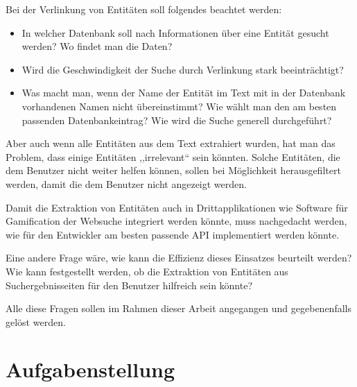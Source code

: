 Bei der Verlinkung von Entitäten soll folgendes beachtet werden:
\begin{itemize}
\item In welcher Datenbank soll nach Informationen über eine Entität gesucht werden? Wo findet man die Daten?
\item Wird die Geschwindigkeit der Suche durch Verlinkung stark beeinträchtigt?
\item Was macht man, wenn der Name der Entität im Text mit in der Datenbank vorhandenen Namen nicht übereinstimmt? Wie wählt man den am besten passenden Datenbankeintrag? Wie wird die Suche generell durchgeführt?
\end{itemize}

Aber auch wenn alle Entitäten aus dem Text extrahiert wurden, hat man das Problem, dass einige Entitäten ,,irrelevant`` sein könnten. Solche Entitäten, die dem Benutzer nicht weiter helfen können, sollen bei Möglichkeit herausgefiltert werden, damit die dem Benutzer nicht angezeigt werden. 

Damit die Extraktion von Entitäten auch in Drittapplikationen wie Software für Gamification der Websuche\cite{Karatassis:15} integriert werden könnte, muss nachgedacht werden, wie für den Entwickler am besten passende API implementiert werden könnte.

Eine andere Frage wäre, wie kann die Effizienz dieses Einsatzes beurteilt werden? Wie kann festgestellt werden, ob die Extraktion von Entitäten aus Suchergebnisseiten für den Benutzer hilfreich sein könnte?

Alle diese Fragen sollen im Rahmen dieser Arbeit angegangen und gegebenenfalls gelöst werden.

\section{Aufgabenstellung}
\label{sec:Aufgabenstellung}
